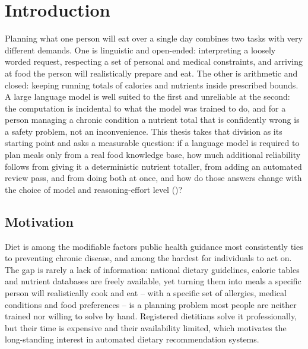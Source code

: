 \chapter{Introduction}
\label{cha:introduction}

Planning what one person will eat over a single day combines two tasks with very different demands. One is linguistic and open-ended: interpreting a loosely worded request, respecting a set of personal and medical constraints, and arriving at food the person will realistically prepare and eat. The other is arithmetic and closed: keeping running totals of calories and nutrients inside prescribed bounds. A large language model is well suited to the first and unreliable at the second: the computation is incidental to what the model was trained to do, and for a person managing a chronic condition a nutrient total that is confidently wrong is a safety problem, not an inconvenience. This thesis takes that division as its starting point and asks a measurable question: if a language model is required to plan meals only from a real food knowledge base, how much additional reliability follows from giving it a deterministic nutrient totaller, from adding an automated review pass, and from doing both at once, and how do those answers change with the choice of model and reasoning-effort level ()?

\section{Motivation}
\label{sec:introduction-motivation}

Diet is among the modifiable factors public health guidance most consistently ties to preventing chronic disease, and among the hardest for individuals to act on. The gap is rarely a lack of information: national dietary guidelines, calorie tables and nutrient databases are freely available, yet turning them into meals a specific person will realistically cook and eat -- with a specific set of allergies, medical conditions and food preferences -- is a planning problem most people are neither trained nor willing to solve by hand. Registered dietitians solve it professionally, but their time is expensive and their availability limited, which motivates the long-standing interest in automated dietary recommendation systems.

